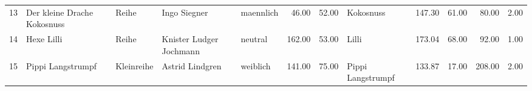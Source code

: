 \begin{table}
\begin{center}
{\begin{tabular}{rllllrrlrrrr}
  13 & Der kleine Drache Kokosnuss                                                                                                                                                                                                                                     & Reihe & Ingo Siegner                                                                                                                                                                                                                                                    & maennlich & 46.00 & 52.00 & Kokosnuss                                                                                                                                                                                                                                                       & 147.30 & 61.00 & 80.00 & 2.00 \\ 
  14 & Hexe Lilli                                                                                                                                                                                                                                                      & Reihe & Knister Ludger Jochmann                                                                                                                                                                                                                                         & neutral & 162.00 & 53.00 & Lilli                                                                                                                                                                                                                                                           & 173.04 & 68.00 & 92.00 & 1.00 \\ 
  15 & Pippi Langstrumpf                                                                                                                                                                                                                                               & Kleinreihe & Astrid Lindgren                                                                                                                                                                                                                                                 & weiblich & 141.00 & 75.00 & Pippi Langstrumpf                                                                                                                                                                                                                                               & 133.87 & 17.00 & 208.00 & 2.00 \\ 

\end{tabular}}
\end{center}
\end{table}
